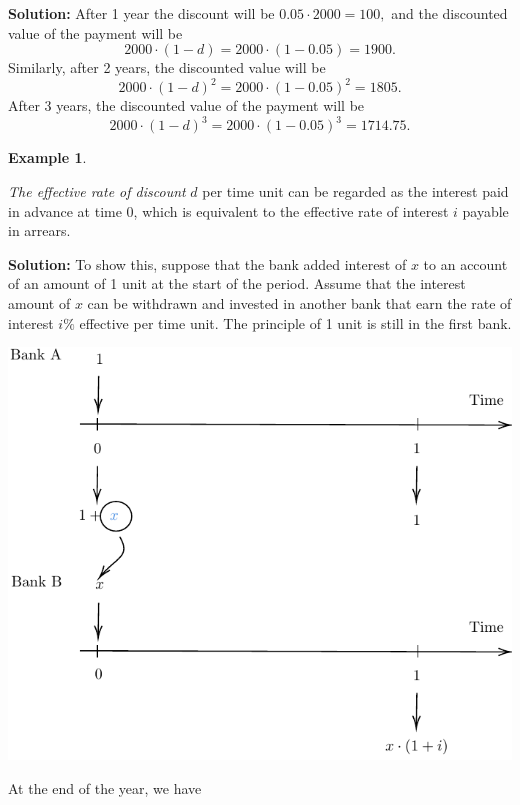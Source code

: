 \documentclass[landscape, 20pt]{extreport}
\theoremstyle{definition}
\theoremstyle{definition}
\newtheorem{example}{Example}[chapter]
\theoremstyle{definition}
\theoremstyle{definition}
\theoremstyle{remark}
\begin{document}
\textbf{Solution:} After 1 year the discount will be \(0.05 \cdot 2000 = 100,\)
and the discounted value of the payment will be
\[2000 \cdot (1 - d) = 2000 \cdot (1 - 0.05) = 1900 .\] Similarly, after
2 years, the discounted value will be
\[2000 \cdot (1 - d)^2 = 2000 \cdot (1 - 0.05)^2 = 1805 .\] After 3
years, the discounted value of the payment will be
\[2000 \cdot (1 - d)^3 = 2000 \cdot (1 - 0.05)^3 = 1714.75 .\]

\newpage \begin{example}
\protect\hypertarget{exm:unlabeled-div-29}{}\label{exm:unlabeled-div-29}

\emph{The effective rate of discount} \(d\) per time unit can be regarded as
the interest paid in advance at time 0, which is equivalent to the
effective rate of interest \(i\) payable in arrears.

\end{example}

\textbf{Solution:} To show this, suppose that the bank added interest of \(x\)
to an account of an amount of 1 unit at the start of the period. Assume
that the interest amount of \(x\) can be withdrawn and invested in another
bank that earn the rate of interest \(i\%\) effective per time unit. The
principle of 1 unit is still in the first bank.

\begin{center}\includegraphics{tikz-ex15-1} \end{center}

At the end of the year, we have
\end{document}
